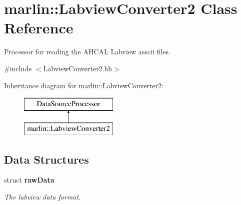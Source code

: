 \section{marlin\-:\-:Labview\-Converter2 Class Reference}
\label{classmarlin_1_1LabviewConverter2}


Processor for reading the A\-H\-C\-A\-L Labview asscii files.  




{\ttfamily \#include $<$Labview\-Converter2.\-hh$>$}

Inheritance diagram for marlin\-:\-:Labview\-Converter2\-:\begin{figure}[H]
\begin{center}
\leavevmode
\includegraphics[height=2.000000cm]{classmarlin_1_1LabviewConverter2}
\end{center}
\end{figure}
\subsection*{Data Structures}
\begin{DoxyCompactItemize}
\item 
struct {\bf raw\-Data}
\begin{DoxyCompactList}\small\item\em The labview data format. \end{DoxyCompactList}\end{DoxyCompactItemize}
